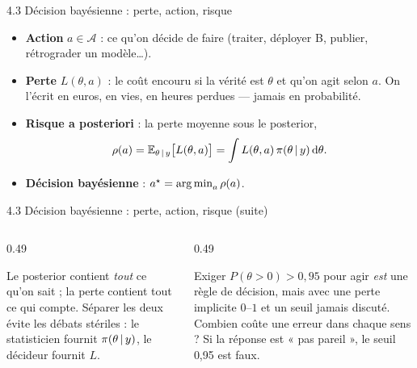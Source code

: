\begin{frame}{4.3 Décision bayésienne : perte, action, risque}
\begin{kbox}
\begin{itemize}
  \item \textbf{Action} $a \in \mathcal{A}$ : ce qu'on décide de faire (traiter,
        déployer B, publier, rétrograder un modèle\dots).
  \item \textbf{Perte} $L(\theta, a)$ : le coût encouru si la vérité est
        $\theta$ et qu'on agit selon $a$. On l'écrit en euros, en vies,
        en heures perdues --- jamais en probabilité.
  \item \textbf{Risque a posteriori} : la perte moyenne sous le posterior,
        \[
        \rho(a) = \mathbb{E}_{\theta \,\vert\, y}\big[L(\theta,a)\big]
        = \int L(\theta,a)\,\pi(\theta \,\vert\, y)\,\mathrm{d}\theta .
        \]
  \item \textbf{Décision bayésienne} : $a^\star = \operatorname*{arg\,min}_{a} \rho(a)$.
\end{itemize}
\end{kbox}
\vspace{1mm}
\end{frame}

\begin{frame}{4.3 Décision bayésienne : perte, action, risque (suite)}
\begin{columns}[t]
\begin{column}{0.49\textwidth}
\begin{ebox}
Le posterior contient \emph{tout} ce qu'on sait ; la perte contient tout
ce qui compte. Séparer les deux évite les débats stériles : le statisticien
fournit $\pi(\theta \,\vert\, y)$, le décideur fournit $L$.
\end{ebox}
\end{column}
\begin{column}{0.49\textwidth}
\begin{wbox}
Exiger $P(\theta > 0) > 0{,}95$ pour agir \emph{est} une règle de décision,
mais avec une perte implicite $0$--$1$ et un seuil jamais discuté.
Combien coûte une erreur dans chaque sens ? Si la réponse est « pas pareil »,
le seuil 0,95 est faux.
\end{wbox}
\end{column}
\end{columns}
\end{frame}

